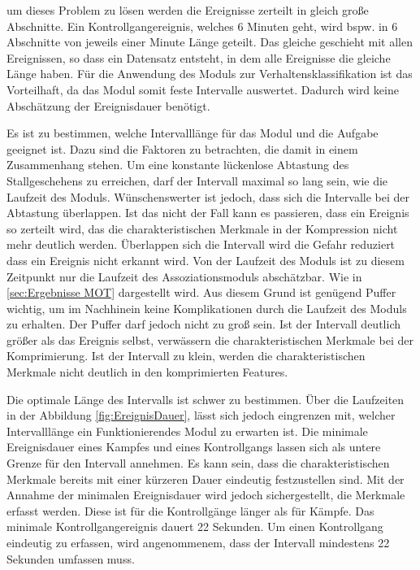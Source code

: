 um dieses Problem zu lösen werden die Ereignisse zerteilt in gleich große Abschnitte. Ein Kontrollgangereignis, welches 6 Minuten geht, wird bspw. in 6 Abschnitte von jeweils einer Minute Länge geteilt. Das gleiche geschieht mit allen Ereignissen, so dass ein Datensatz entsteht, in dem alle Ereignisse die gleiche Länge haben. Für die Anwendung des Moduls zur Verhaltensklassifikation ist das Vorteilhaft, da das Modul somit feste Intervalle auswertet. Dadurch wird keine Abschätzung der Ereignisdauer benötigt. \par

Es ist zu bestimmen, welche Intervalllänge für das Modul und die Aufgabe geeignet ist. Dazu sind die Faktoren zu betrachten, die damit in einem Zusammenhang stehen. Um eine konstante lückenlose Abtastung des Stallgeschehens zu erreichen, darf der Intervall maximal so lang sein, wie die Laufzeit des Moduls. Wünschenswerter ist jedoch, dass sich die Intervalle bei der Abtastung überlappen. Ist das nicht der Fall kann es passieren, dass ein Ereignis so zerteilt wird, das die charakteristischen Merkmale in der Kompression nicht mehr deutlich werden. Überlappen sich die Intervall wird die Gefahr reduziert dass ein Ereignis nicht erkannt wird. Von der Laufzeit des Moduls ist zu diesem Zeitpunkt nur die Laufzeit des Assoziationsmoduls abschätzbar. Wie in \autoref{sec:Ergebnisse MOT} dargestellt wird. Aus diesem Grund ist genügend Puffer wichtig, um im Nachhinein keine Komplikationen durch die Laufzeit des Moduls zu erhalten. Der Puffer darf jedoch nicht zu groß sein. Ist der Intervall deutlich größer als das Ereignis selbst, verwässern die charakteristischen Merkmale bei der Komprimierung. Ist der Intervall zu klein, werden die charakteristischen Merkmale nicht deutlich in den komprimierten Features. \par

Die optimale Länge des Intervalls ist schwer zu bestimmen. Über die Laufzeiten in der Abbildung \ref{fig:EreignisDauer}, lässt sich jedoch eingrenzen mit, welcher Intervalllänge ein Funktionierendes Modul zu erwarten ist. Die minimale Ereignisdauer eines Kampfes und eines Kontrollgangs lassen sich als untere Grenze für den Intervall annehmen. Es kann sein, dass die charakteristischen Merkmale bereits mit einer kürzeren Dauer eindeutig festzustellen sind. Mit der Annahme der minimalen Ereignisdauer wird jedoch sichergestellt, die Merkmale erfasst werden. Diese ist für die Kontrollgänge länger als für Kämpfe. Das minimale Kontrollgangereignis dauert 22 Sekunden. Um einen Kontrollgang eindeutig zu erfassen, wird angenommenem, dass der Intervall mindestens 22 Sekunden umfassen muss. \par

